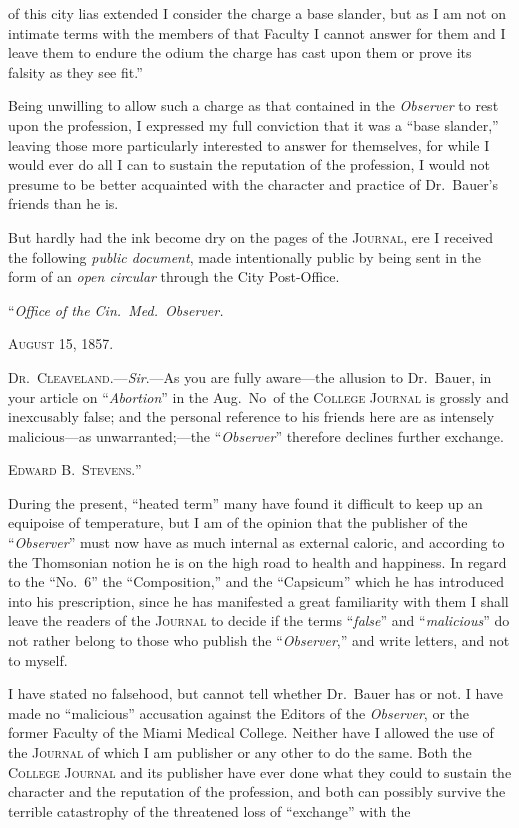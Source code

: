 of this city lias extended I consider the charge a base slander, but as I
am not on intimate terms with the members of that Faculty I cannot
answer for them and I leave them to endure the odium the charge has
cast upon them or prove its falsity as they see fit.''

Being unwilling to allow such a charge as that contained in the
\emph{Observer} to rest upon the profession, I expressed my full conviction
that it was a ``base slander,'' leaving those more particularly interested
to answer for themselves, for while I would ever do all I can to sustain
the reputation of the profession, I would not presume to be better
acquainted with the character and practice of Dr.\ Bauer's friends
than he is.

But hardly had the ink become dry on the pages of the \textsc{Journal}, ere
I received the following \emph{public document}, made intentionally public by
being sent in the form of an \emph{open circular} through the City Post-Office.

\hfill{}``\emph{Office of the Cin.\ Med.\ Observer.}\quad

\hfill{}\textsc{August 15, 1857.}\quad

\textsc{Dr.\ Cleaveland}.---\emph{Sir}.---As you are fully aware---the allusion to
Dr.\ Bauer, in your article on ``\emph{Abortion}'' in the Aug.\ No\ of the
\textsc{College Journal} is grossly and inexcusably false; and the personal
reference to his friends here are as intensely malicious---as unwarranted;---the
``\emph{Observer}'' therefore declines further exchange.

\hfill{}\textsc{Edward B.\ Stevens.}''\quad

During the present, ``heated term'' many have found it difficult to
keep up an equipoise of temperature, but I am of the opinion that the
publisher of the ``\emph{Observer}'' must now have as much internal as
external caloric, and according to the Thomsonian notion he is on
the high road to health and happiness. In regard to the ``No.\ 6'' the
``Composition,'' and the ``Capsicum'' which he has introduced into
his prescription, since he has manifested a great familiarity with them
I shall leave the readers of the \textsc{Journal} to decide if the terms ``\emph{false}''
and ``\emph{malicious}'' do not rather belong to those who publish the ``\emph{Observer},''
and write letters, and not to myself.

I have stated no falsehood, but cannot tell whether Dr.\ Bauer has
or not. I have made no ``malicious'' accusation against the Editors of
the \emph{Observer}, or the former Faculty of the Miami Medical College.
Neither have I allowed the use of the \textsc{Journal} of which I am publisher
or any other to do the same. Both the \textsc{College Journal} and
its publisher have ever done what they could to sustain the character
and the reputation of the profession, and both can possibly survive
the terrible catastrophy of the threatened loss of ``exchange'' with the\endinput
